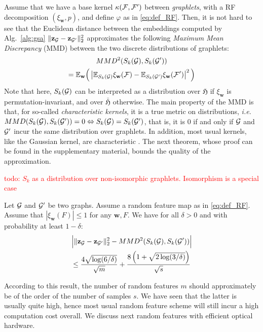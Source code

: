 \documentclass{article}
\begin{document}
Assume that we have a base kernel $\kappa(\mathcal{F},\mathcal{F}')$ between \emph{graphlets}, with a RF decomposition $(\xi_\mathbf{w}, p)$, and define $\varphi$ as in \eqref{eq:def_RF}. Then, it is not hard to see that the Euclidean distance between the embeddings computed by Alg.~\ref{alg:gsa} $\|\mathbf{z}_{\mathcal{G}} - \mathbf{z}_{\mathcal{G}'}\|_2^2$ approximates the following \emph{Maximum Mean Discrepancy} (MMD) \cite{gretton, sriperumbudur} between the two discrete distributions of graphlets:
 \begin{multline}
 MMD^2(S_k(\mathcal{G}), S_k(\mathcal{G}')) \\= \mathbb{E}_{\mathbf{w}} \Big( \left| \mathbb{E}_{S_k(\mathcal{G})} \xi_\mathbf{w}(\mathcal{F}) - \mathbb{E}_{S_k(\mathcal{G}')} \xi_\mathbf{w}(\mathcal{F}') \right|^2 \Big)
 \end{multline}
Note that here, $S_k(\mathcal{G})$ can be interpreted as a distribution over $\mathfrak{H}$ if $\xi_\mathbf{w}$ is permutation-invariant, and over $\bar{\mathfrak{H}}$ otherwise. The main property of the MMD is that, for so-called \emph{characteristic kernels}, it is a true metric on distributions, \emph{i.e.} $MMD(S_k(\mathcal{G}), S_k(\mathcal{G}')) = 0 \Leftrightarrow S_k(\mathcal{G}) = S_k(\mathcal{G}')$, that is, it is $0$ if and only if $\mathcal{G}$ and $\mathcal{G}'$ incur the same distribution over graphlets. In addition, most usual kernels, like the Gaussian kernel, are characteristic \cite{MMD}.
%
The next theorem, whose proof can be found in the supplementary material, bounds the quality of the approximation. %

\textcolor{red}{todo: $S_k$ as a distribution over non-isomorphic graphlets. Isomorphism is a special case}

\begin{theorem}\label{theorem:concentration}
Let $\mathcal{G}$ and $\mathcal{G}'$ be two graphs. %
Assume a random feature map as in \eqref{eq:def_RF}. Assume that $|\xi_\mathbf{w}(F)| \leq 1$ for any $\mathbf{w},F$.
We have for all $\delta>0$ and with probability at least $1-\delta$:
\begin{multline*}
 \Big|\|\mathbf{z}_{\mathcal{G}} - \mathbf{z}_{\mathcal{G}'} \|_2^2 - MMD^2(S_k(\mathcal{G}),S_k(\mathcal{G}')) \Big| \\ \leq\frac{4 \sqrt{\log (6/\delta)}}{\sqrt{m}} + \frac{8\left(1+\sqrt{2\log(3/\delta)}\right)}{\sqrt{{s}}}
\end{multline*}
\end{theorem}
According to this result, the number of random features $m$ should approximately be of the order of the number of samples $s$. We have seen that the latter is usually quite high, hence most usual random feature scheme will still incur a high computation cost overall. We discuss next random features with efficient optical hardware.
\end{document}
